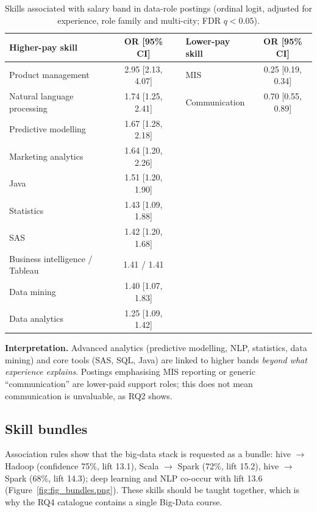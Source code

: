 \begin{table}[H]\centering\small
\caption{Skills associated with salary band in data-role postings (ordinal logit, adjusted for
experience, role family and multi-city; FDR $q<0.05$).}\label{tab:pay}
\begin{tabular}{@{}l c c l c@{}}
\toprule
Higher-pay skill & OR [95\% CI] & & Lower-pay skill & OR [95\% CI]\\
\midrule
Product management & 2.95 [2.13, 4.07] & & MIS & 0.25 [0.19, 0.34]\\
Natural language processing & 1.74 [1.25, 2.41] & & Communication & 0.70 [0.55, 0.89]\\
Predictive modelling & 1.67 [1.28, 2.18] & & & \\
Marketing analytics & 1.64 [1.20, 2.26] & & & \\
Java & 1.51 [1.20, 1.90] & & & \\
Statistics & 1.43 [1.09, 1.88] & & & \\
SAS & 1.42 [1.20, 1.68] & & & \\
Business intelligence / Tableau & 1.41 / 1.41 & & & \\
Data mining & 1.40 [1.07, 1.83] & & & \\
Data analytics & 1.25 [1.09, 1.42] & & & \\
\bottomrule
\end{tabular}
\end{table}


\textbf{Interpretation.} Advanced analytics (predictive modelling, NLP, statistics, data mining)
and core tools (SAS, SQL, Java) are linked to higher bands \emph{beyond what experience explains}.
Postings emphasising MIS reporting or generic ``communication'' are lower-paid support roles; this
does not mean communication is unvaluable, as RQ2 shows.

\subsection{Skill bundles}

Association rules show that the big-data stack is requested as a bundle: hive $\rightarrow$ Hadoop
(confidence 75\%, lift 13.1), Scala $\rightarrow$ Spark (72\%, lift 15.2), hive $\rightarrow$ Spark
(68\%, lift 14.3); deep learning and NLP co-occur with lift 13.6 (Figure~\ref{fig:fig_bundles.png}).
These skills should be taught together, which is why the RQ4 catalogue contains a single Big-Data
course.

